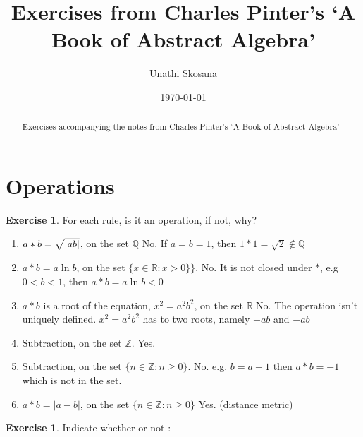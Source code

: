 \documentclass[nohyper,nobib]{tufte-handout}
\title{Exercises from  Charles Pinter's `A Book of Abstract Algebra'} %
\author{Unathi Skosana}
\date{\vspace{-5pt}\normalsize \today} %
\theoremstyle{definition}
\newtheorem{exer}[thm]{Exercise}
\theoremstyle{remark}
\begin{document}
\justifying 
\maketitle

\begin{abstract}
\noindent
Exercises accompanying the notes from Charles Pinter's `A Book of Abstract Algebra'
\end{abstract}

\tableofcontents

\section{Operations}

\begin{exer}
    For each rule, is it an operation, if not, why?
\end{exer}

\begin{enumerate}
    \item $a * b  = \sqrt{\abs{a b}}$, on the set $\mathbb{Q}$ 
        \newline
        No. If $a = b = 1$, then $1 * 1 = \sqrt{2} \not\in \mathbb{Q}$
    \item $a * b  = a\ln{b}$, on the set $\{ x \in \mathbb{R}: x > 0\} \}$.
        \newline
        No. It is not closed under $*$, e.g $0 < b < 1$, then $a * b  = a\ln{b} < 0$
    \item $a * b$ is a root of the equation, $x^2 = a^2b^2$, on the set $\mathbb{R}$
        \newline
        No. The operation isn't uniquely defined. $x^2 = a^2b^2$ has to two roots, namely $+ab$ and $-ab$
    \item Subtraction, on the set $\mathbb{Z}$. 
        \newline
        Yes. 
    \item Subtraction, on the set $\{ n \in \mathbb{Z}: n \geq 0 \}$.
        \newline
        No. e.g. $b = a + 1$ then $a * b = -1$ which is not in the set.
    \item $a * b = |a - b|$, on the set $\{ n \in \mathbb{Z}: n \geq 0\}$
        \newline
        Yes. (distance metric)
\end{enumerate}

\noindent
\begin{exer}
    Indicate whether or not :
\end{exer}
\end{document}
